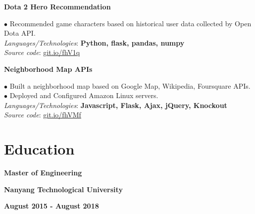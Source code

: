 \documentclass[10pt]{article}
\begin{document}
        \begin{center}
            \textbf{Dota 2 Hero Recommendation}
        \end{center}
        $\bullet$ {Recommended game characters based on historical user data collected by Open Dota API.} \\
        \emph{Languages/Technologies}: \textbf{Python, flask, pandas, numpy} \\
        \emph{Source code}: \href{https://git.io/fhV1q}{git.io/fhV1q}


        \begin{center}
            \textbf{Neighborhood Map APIs}
        \end{center}
        $\bullet$ {Built a neighborhood map based on Google Map, Wikipedia, Foursquare APIs.} \\
        $\bullet$ {Deployed and Configured Amazon Linux servers.} \\
        \emph{Languages/Technologies}: \textbf{Javascript, Flask, Ajax, jQuery, Knockout} \\
        \emph{Source code}: \href{https://git.io/fhVMf}{git.io/fhVMf}


    \vspace{-2mm}
    \section{Education}
        \vspace{-5mm}

        \begin{multicols}{3}
            \begin{flushleft}
                \textbf{Master of Engineering}
            \end{flushleft}

            \columnbreak

            \begin{center}
                \textbf{Nanyang Technological University}
            \end{center}

            \columnbreak

            \begin{flushright}
                \textbf{August 2015 - August 2018}
            \end{flushright}
        \end{multicols}
\end{document}

